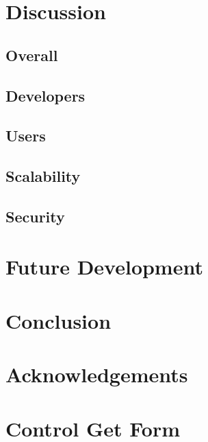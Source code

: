 \documentclass{sig-alternate}
\begin{document}
\section{Discussion}



\subsection{Overall}


\subsection{Developers}



\subsection{Users}



\subsection{Scalability}

\subsection{Security}



\section{Future Development}

\section{Conclusion}

\section{Acknowledgements}

\nocite{*}



\clearpage
\newpage

\onecolumn
\appendix
\section{Control Get Form}
\label{appendix_a}


\end{document}
